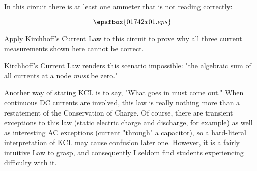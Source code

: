 

In this circuit there is at least one ammeter that is not reading correctly:

$$\epsfbox{01742x01.eps}$$

Apply Kirchhoff's Current Law to this circuit to prove why all three current measurements shown here cannot be correct.







Kirchhoff's Current Law renders this scenario impossible: "the algebraic sum of all currents at a node {\it must} be zero."







Another way of stating KCL is to say, "What goes in must come out."  When continuous DC currents are involved, this law is really nothing more than a restatement of the Conservation of Charge.  Of course, there are transient exceptions to this law (static electric charge and discharge, for example) as well as interesting AC exceptions (current "through" a capacitor), so a hard-literal interpretation of KCL may cause confusion later one.  However, it is a fairly intuitive Law to grasp, and consequently I seldom find students experiencing difficulty with it.




